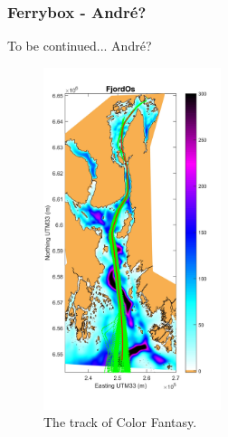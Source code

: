 \documentclass[12pt,a4paper,english]{article}
\begin{document}
\clearpage

\subsubsection{Ferrybox - Andr\'{e}?}
To be continued... Andr\'{e}?

\begin{figure}[t]
\centerline{
\includegraphics*[trim=1cm 0cm 1cm 0cm,clip=true,height=10cm]{Figurer/FjordOs_with_FA_track}}
\caption{\small
The track of Color Fantasy.}
\label{fig:Ferrybox_track}
\end{figure}
\end{document}
